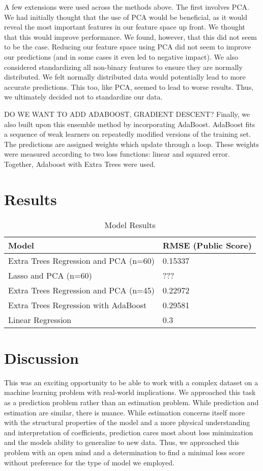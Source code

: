 \documentclass[11pt, oneside]{article}   	%
\begin{document}
A few extensions were used across the methods above. The first involves PCA. We had initially thought that the use of PCA would be beneficial, as it would reveal the most important features in our feature space up front. We thought that this would improve performance. We found, however, that this did not seem to be the case. Reducing our feature space using PCA did not seem to improve our predictions (and in some cases it even led to negative impact). We also considered standardizing all non-binary features to ensure they are normally distributed. We felt normally distributed data would potentially lead to more accurate predictions. This too, like PCA, seemed to lead to worse results. Thus, we ultimately decided not to standardize our data. 

DO WE WANT TO ADD ADABOOST, GRADIENT DESCENT? Finally, we also built upon this ensemble method by incorporating AdaBoost. AdaBoost fits a sequence of weak learners on repeatedly modified versions of the training set. The predictions are assigned weights which update through a loop. These weights were measured according to two loss functions: linear and squared error. Together, Adaboost with Extra Trees were used.



\section{Results}

\begin{table}[]
\centering

\label{my-label}
\begin{tabular}{@{}ll@{}}
\toprule
\textbf{Model} & \textbf{RMSE (Public Score)} \\ \midrule
Extra Trees Regression and PCA (n=60)  & 0.15337  \\
Lasso and PCA (n=60)  & ???  \\
Extra Trees Regression and PCA (n=45)   & 0.22972  \\
Extra Trees Regression with AdaBoost  & 0.29581  \\
Linear Regression & 0.3  \\ \bottomrule
\end{tabular}
\caption{Model Results}
\end{table}

\section{Discussion}
This was an exciting opportunity to be able to work with a complex dataset on a machine learning problem with real-world implications. We approached this task as a prediction problem rather than an estimation problem. While prediction and estimation are similar, there is nuance. While estimation concerns itself more with the structural properties of the model and a more physical understanding and interpretation of coefficients, prediction cares most about loss minimization and the models ability to generalize to new data. Thus, we approached this problem with an open mind and a determination to find a minimal loss score without preference for the type of model we employed. 
\end{document}
